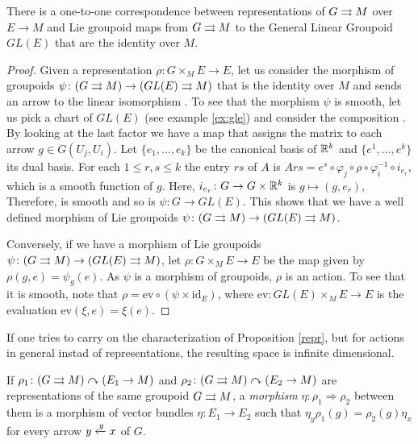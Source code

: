 \begin{prop}\label{repr}
There is a one-to-one correspondence between representations of $G\rightrightarrows M$ over $E\to M$ and Lie groupoid maps from $G\rightrightarrows M$ to the General Linear Groupoid $GL(E)$
that are the identity over $M$.
\end{prop}

\begin{proof}
Given a representation $\rho\colon G\times_ME\to E$, let us consider the morphism of groupoids $\psi\colon(G\rightrightarrows M)\to(GL(E)\rightrightarrows M)$ that is the identity over $M$ and sends an arrow  to the linear isomorphism .
To see that the morphism $\psi$ is smooth, let us pick a chart  of $GL(E)$ (see example \ref{ex:gle}) and consider the composition .
By looking at the last factor we have a map  that assigns the matrix  to each arrow $g\in G(U_j,U_i)$.
Let $\{e_1,\dots,e_k\}$ be the canonical basis of $\mathbb R^k$ and $\{e^1,\dots,e^k\}$ its dual basis.
For each $1\leq r,s\leq k$ the entry $rs$ of $A$ is $A{rs}=e^s\circ\varphi_j\circ\rho\circ\varphi_i^{-1}\circ i_{e_r}$,
which is a smooth function of $g$.
Here, $i_{e_r}\colon G\to G\times\mathbb R^k$ is $g\mapsto(g,e_r)$,
Therefore,  is smooth and so is $\psi\colon G\to GL(E)$.
This shows that we have a well defined morphism of Lie groupoids $\psi\colon(G\rightrightarrows M)\to(GL(E)\rightrightarrows M)$.

Conversely, if we have a morphism of Lie groupoids $\psi\colon(G\rightrightarrows M)\to(GL(E)\rightrightarrows M)$, let $\rho\colon G\times_ME\to E$ be the map given by $\rho(g,e)=\psi_g(e)$.
As $\psi$ is a morphism of groupoids, $\rho$ is an action.
To see that it is smooth, note that $\rho=\text{ev}\circ(\psi\times \text{id}_E)$, where $\text{ev}\colon GL(E)\times_M E\to E$ is the evaluation $\text{ev}(\xi,e)=\xi(e)$.
\end{proof}

If one tries to carry on the characterization of Proposition \ref{repr}, but for actions in general instad of representations, the resulting space is infinite dimensional.

If $\rho_1\colon (G\rightrightarrows M)\curvearrowright (E_1\to M)$ and $\rho_2\colon (G\rightrightarrows M)\curvearrowright (E_2\to M)$ are representations of the same groupoid $G\rightrightarrows M$, a \emph{morphism} $\eta\colon \rho_1 \Rightarrow \rho_2$ between them is a morphism of vector bundles $\eta\colon E_1 \to E_2$ such that $\eta_y\rho_1(g) = \rho_2(g)\eta_x$ for every arrow $y\xleftarrow{g}x$ of $G$.

